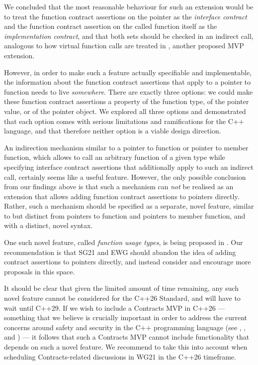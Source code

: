 We concluded that the most reasonable behaviour for such an extension would be to treat the function contract assertions on the pointer as the \emph{interface contract} and the function contract assertion on the called function itself as the \emph{implementation contract}, and that both sets should be checked in an indirect call, analogous to how virtual function calls are treated in \cite{P3097R0}, another proposed MVP extension.

However, in order to make such a feature actually specifiable and implementable, the information about the function contract assertions that apply to a pointer to function needs to live \emph{somewhere}. There are exactly three options: we could make these function contract assertions a property of the function type, of the pointer value, or of the pointer object. We explored all three options and demonstrated that each option comes with serious limitations and ramifications for the C++ language, and that therefore neither option is a viable design direction.

An indirection mechanism similar to a pointer to function or pointer to member function, which allows to call an arbitrary function of a given type while specifying interface contract assertions that additionally apply to such an indirect call, certainly seems like a useful feature. However, the only possible conclusion from our findings above is that such a mechanism can \emph{not} be realised as an extension that allows adding function contract assertions to pointers directly. Rather, such a mechanism should be specified as a separate, novel feature, similar to but distinct from pointers to function and pointers to member function, and with a distinct, novel syntax.

One such novel feature, called \emph{function usage types}, is being proposed in \cite{P3271R0}. Our recommendation is that SG21 and EWG should abandon the idea of adding contract assertions to pointers directly, and instead consider \cite{P3271R0} and encourage more proposals in this space.

It should be clear that given the limited amount of time remaining, any such novel feature cannot be considered for the C++26 Standard, and will have to wait until C++29. If we wish to include a Contracts MVP in C++26 --- something that we believe is crucially important in order to address the current concerns around safety and security in the C++ programming language (see \cite{P3269R0}, \cite{P3276R0}, and \cite{P3297R0}) --- it follows that such a Contracts MVP cannot include functionality that depends on such a novel feature. We recommend to take this into account when scheduling Contracts-related discussions in WG21 in the C++26 timeframe.

